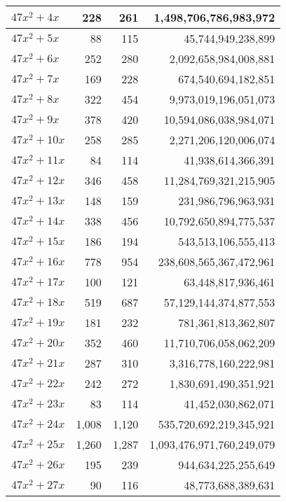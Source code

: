 \documentclass[a4paper]{amsproc}
\theoremstyle{plain}
\theoremstyle{named}
\begin{document}
\begin{longtable}{ | l | r | r | r | }
$47x^2 + 4x$ & 228 & 261 & 1{,}498{,}706{,}786{,}983{,}972 \\ \hline
$47x^2 + 5x$ & 88 & 115 & 45{,}744{,}949{,}238{,}899 \\ \hline
$47x^2 + 6x$ & 252 & 280 & 2{,}092{,}658{,}984{,}008{,}881 \\ \hline
$47x^2 + 7x$ & 169 & 228 & 674{,}540{,}694{,}182{,}851 \\ \hline
$47x^2 + 8x$ & 322 & 454 & 9{,}973{,}019{,}196{,}051{,}073 \\ \hline
$47x^2 + 9x$ & 378 & 420 & 10{,}594{,}086{,}038{,}984{,}071 \\ \hline
$47x^2 + 10x$ & 258 & 285 & 2{,}271{,}206{,}120{,}006{,}074 \\ \hline
$47x^2 + 11x$ & 84 & 114 & 41{,}938{,}614{,}366{,}391 \\ \hline
$47x^2 + 12x$ & 346 & 458 & 11{,}284{,}769{,}321{,}215{,}905 \\ \hline
$47x^2 + 13x$ & 148 & 159 & 231{,}986{,}796{,}963{,}931 \\ \hline
$47x^2 + 14x$ & 338 & 456 & 10{,}792{,}650{,}894{,}775{,}537 \\ \hline
$47x^2 + 15x$ & 186 & 194 & 543{,}513{,}106{,}555{,}413 \\ \hline
$47x^2 + 16x$ & 778 & 954 & 238{,}608{,}565{,}367{,}472{,}961 \\ \hline
$47x^2 + 17x$ & 100 & 121 & 63{,}448{,}817{,}936{,}461 \\ \hline
$47x^2 + 18x$ & 519 & 687 & 57{,}129{,}144{,}374{,}877{,}553 \\ \hline
$47x^2 + 19x$ & 181 & 232 & 781{,}361{,}813{,}362{,}807 \\ \hline
$47x^2 + 20x$ & 352 & 460 & 11{,}710{,}706{,}058{,}062{,}209 \\ \hline
$47x^2 + 21x$ & 287 & 310 & 3{,}316{,}778{,}160{,}222{,}981 \\ \hline
$47x^2 + 22x$ & 242 & 272 & 1{,}830{,}691{,}490{,}351{,}921 \\ \hline
$47x^2 + 23x$ & 83 & 114 & 41{,}452{,}030{,}862{,}071 \\ \hline
$47x^2 + 24x$ & 1{,}008 & 1{,}120 & 535{,}720{,}692{,}219{,}345{,}921 \\ \hline
$47x^2 + 25x$ & 1{,}260 & 1{,}287 & 1{,}093{,}476{,}971{,}760{,}249{,}079 \\ \hline
$47x^2 + 26x$ & 195 & 239 & 944{,}634{,}225{,}255{,}649 \\ \hline
$47x^2 + 27x$ & 90 & 116 & 48{,}773{,}688{,}389{,}631 \\ \hline

\end{longtable}
\end{document}
